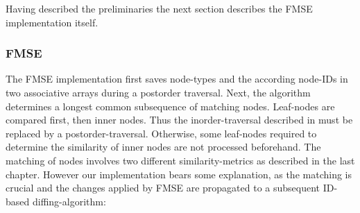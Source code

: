 Having described the preliminaries the next section describes the FMSE implementation itself.

\subsubsection{FMSE} The FMSE implementation first saves node-types and the according node-IDs in two associative arrays during a postorder traversal. Next, the algorithm determines a longest common subsequence of matching nodes. Leaf-nodes are compared first, then inner nodes. Thus the inorder-traversal described in \cite{chawathe1996change} must be replaced by a postorder-traversal. Otherwise, some leaf-nodes required to determine the similarity of inner nodes are not processed beforehand. The matching of nodes involves two different similarity-metrics as described in the last chapter. However our implementation bears some explanation, as the matching is crucial and the changes applied by FMSE are propagated to a subsequent ID-based diffing-algorithm:

